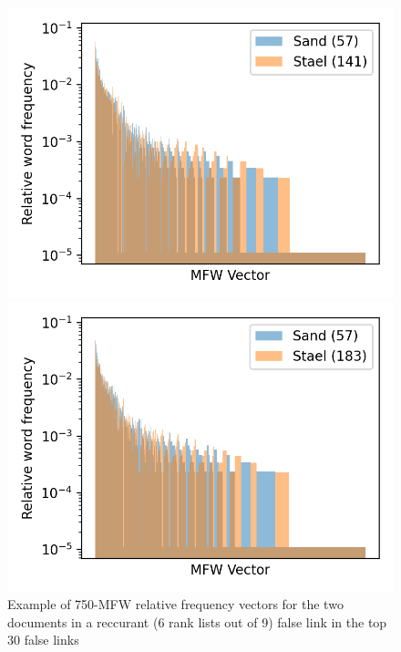 \begin{figure}
  \centering
  \caption{Example of 750-MFW relative frequency vectors for the two documents in a reccurant (6 rank lists out of 9) false link in the top 30 false links}
  \label{fig:mfw_vector_error}

  \label{fig:mfw_vector_error_0}
  \includegraphics[width=\linewidth]{img/mfw_vector_error_0.png}

  \label{fig:mfw_vector_error_1}
  \includegraphics[width=\linewidth]{img/mfw_vector_error_1.png}
\end{figure}

